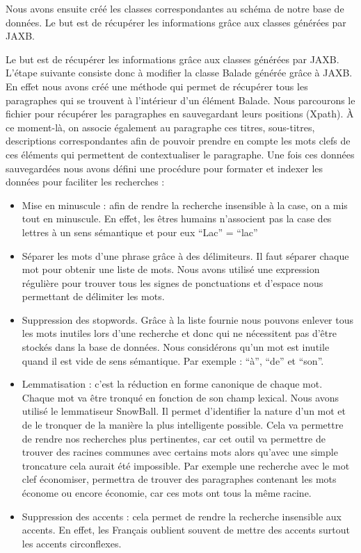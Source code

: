 \documentclass{article}
\begin{document}
Nous avons ensuite créé les classes correspondantes au schéma de notre base de
données. Le but est de récupérer les informations grâce aux classes générées par
JAXB. 

Le but est de récupérer les informations grâce aux classes générées par JAXB.
L’étape suivante consiste donc  à modifier la classe Balade générée grâce à JAXB. En
effet nous avons créé une méthode qui permet de récupérer tous les paragraphes qui se
trouvent à l’intérieur d’un élément Balade. Nous parcourons le fichier pour récupérer
les paragraphes en sauvegardant leurs positions (Xpath). À ce moment-là, on associe
également au paragraphe ces titres, sous-titres, descriptions correspondantes afin de
pouvoir prendre en compte les mots clefs de ces éléments qui permettent de
contextualiser le paragraphe.  Une fois ces données sauvegardées nous avons défini
une procédure pour formater et indexer les données pour faciliter les recherches
:

\begin{itemize}

    \item Mise en minuscule : afin de rendre la recherche insensible à la case, on
        a mis tout en minuscule. En effet, les êtres humains n’associent pas la case
        des lettres à un sens sémantique et pour eux “Lac” = “lac”

    \item Séparer les mots d’une phrase grâce à des délimiteurs. Il faut séparer
        chaque mot pour obtenir une liste de mots. Nous avons utilisé une expression
        régulière pour trouver tous les signes de ponctuations et d’espace nous
        permettant de délimiter les mots. 

    \item Suppression des stopwords. Grâce à la liste fournie nous pouvons enlever
        tous les mots inutiles lors d’une recherche et donc qui ne nécessitent pas
        d’être stockés dans la base de données. Nous considérons qu’un mot est
        inutile quand il est vide de sens sémantique. Par exemple : “à”, “de” et
        “son”.

    \item Lemmatisation : c’est la réduction en forme canonique de chaque mot. Chaque
        mot va être tronqué en fonction de son champ lexical. Nous avons utilisé le
        lemmatiseur SnowBall. Il permet d’identifier la nature d’un mot et de le
        tronquer de la manière la plus intelligente possible. Cela va permettre de
        rendre nos recherches plus pertinentes, car cet outil va permettre de trouver
        des racines communes avec certains mots alors qu’avec une simple troncature
        cela aurait été impossible. Par exemple une recherche avec le mot clef
        économiser, permettra de trouver des paragraphes contenant les mots économe
        ou encore économie, car ces mots ont tous la même racine.

    \item Suppression des accents :  cela permet de rendre la recherche insensible aux
        accents. En effet, les Français oublient souvent de mettre des accents
        surtout les accents circonflexes.

\end{itemize}
\end{document}
